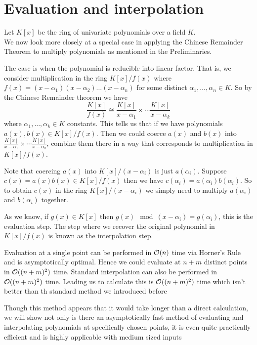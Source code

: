 \chapter{Evaluation and interpolation}\label{chapter2}

Let $K[x]$ be the ring of univariate polynomials over a field $K$.\\
We now look more closely at a special case in applying the Chinese Remainder Theorem to multiply polynomials as mentioned in the Preliminaries.

The case is when the polynomial is reducible into linear factor. That is, we consider multiplication in the ring $K[x] / f(x)$ where $f(x) = (x - \alpha_1)(x - \alpha_2) \ldots (x - \alpha_n)$ for some distinct $\alpha_1, \ldots, \alpha_n \in K$. So by the Chinese Remainder theorem we have
\[
    \frac{K[x]}{f(x)} \cong \frac{K[x]}{x - \alpha_1} \times \cdots \frac{K[x]}{x - \alpha_k}
\]
where $\alpha_1, \ldots, \alpha_k \in K$ constants. This tells us that if we have polynomials $a(x), b(x) \in K[x] / f(x)$. Then we could coerce $a(x)$ and $b(x)$ into $\frac{K[x]}{x - \alpha_1} \times \cdots \frac{K[x]}{x - \alpha_k}$, combine them there in a way that corresponds to multiplication in $K[x] / f(x)$. 

Note that coercing $a(x)$ into $K[x] / (x - \alpha_i)$ is just $a(\alpha_i)$. Suppose $c(x) = a(x)b(x) \in K[x] / f(x)$ then we have $c(\alpha_i) = a(\alpha_i)b(\alpha_i)$. So to obtain $c(x)$ in the ring $K[x] / (x - \alpha_i)$ we simply need to multiply $a(\alpha_i)$ and $b(\alpha_i)$ together.

As we know, if $g(x) \in K[x]$ then $g(x) \mod (x - \alpha_i) = g(\alpha_i)$, this is the evaluation step. The step where we recover the original polynomial in $K[x]/f(x)$ is known as the interpolation step.

Evaluation at a single point can be performed in $\mathcal O(n)$ time via Horner's Rule and is asymptotically optimal. Hence we could evaluate at $n + m$ distinct points in $\mathcal O((n + m)^2)$ time. Standard interpolation can also be performed in $\mathcal O((n+m)^2)$ time. Leading us to calculate this is $\mathcal O((n + m)^2)$ time which isn't better than th standard method we introduced before

Though this method appears that it would take longer than a direct calculation, we will show not only is there an asymptotically fast method of evaluating and interpolating polynomials at specifically chosen points, it is even quite practically efficient and is highly applicable with medium sized inputs

